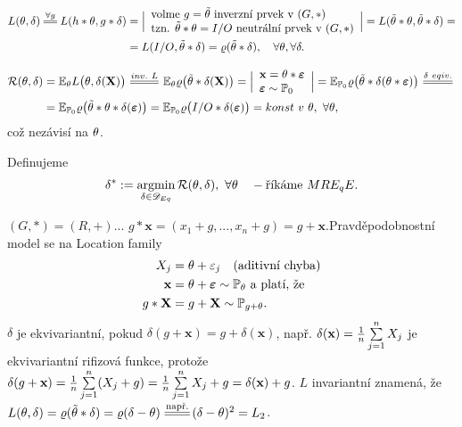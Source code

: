 \begin{dusl}
	\[
	\begin{split}
	L(\t,\delta)\equal{\forall g}L(h\ast\t,g\ast \delta)&=\Big| \begin{array}{l}
	\text{volme }g=\tilde{\t}\text{ inverzní prvek v }(G,\ast)\\\text{tzn. }\tilde{\t}\ast\t=I/O\text{ neutrální prvek v }(G,\ast)
	\end{array}
	\Big|=L(\tilde{\t}\ast\t,\tilde{\t}\ast\delta)=\\&=L(I/O,\tilde{\t}\ast\delta)=\rho(\tilde{\t}\ast\delta),\quad\forall\t,\forall\delta.
	\end{split}
	\] 
\end{dusl}
\begin{dusl}
	\[
	\begin{split}
	\RF(\t,\delta)&=\E_\t L\big(\t,\delta(\textbf{X})\big)\equal{inv.~L}\E_\t\rho\big(\tilde{\t}\ast\delta(\textbf{X})\big)=\Big|\begin{array}{l}
	\textbf{x}=\t\ast\boldsymbol{\epsilon}\\\boldsymbol{\epsilon}\sim\PP_0	
	\end{array}
	\Big|=\E_{\PP_0}\rho\big(\tilde{\t}\ast\delta(\t\ast\boldsymbol{\epsilon})\big)\equal{\delta~eqiv.}\\&=\E_{\PP_0}\rho\big(\tilde{\t}\ast\t\ast\delta(\boldsymbol{\epsilon})\big)=\E_{\PP_0}\rho\big(I/O\ast\delta(\boldsymbol{\epsilon})\big)=konst~v~\t,~\forall\t,
	\end{split}
	\]
což nezávisí na $\theta$.
\end{dusl}
\begin{define}
	Definujeme $$ \delta^\ast:=\mathop{\mathrm{argmin}}_{\delta\in\mathscr{D}_{Eq}}\mathcal{R}(\theta,\delta),~\forall\theta\quad-\text{říkáme }MRE_qE.$$
\end{define}
\begin{example}
	$(G,\ast)=(R,+)$... $g\ast\textbf{x}=(x_1+g,...,x_n+g)=g+\textbf{x}.$Pravděpodobnostní model se na Location family
	\[
\begin{split}
X_j&=\theta+\varepsilon_j\quad(\text{aditivní chyba})\\
\textbf{x}&=\theta+\boldsymbol{\varepsilon}\sim\mathbb{P}_\theta\text{ a platí, že }\\
g\ast \textbf{X}&=g+\textbf{X}\sim \mathbb{P}_{g+\theta}.
\end{split}
\]
	$\delta$ je ekvivariantní, pokud $\delta(g+\textbf{x})=g+\delta(\textbf{x})$, např. $\delta(\textbf{x})=\frac{1}{n}\sum\limits_{j=1}^{n} X_j$ je ekvivariantní rifizová funkce, protože $\delta(g+\textbf{x})=\frac{1}{n}\sum\limits_{j=1}^{n} (X_j+g)=\frac{1}{n}\sum\limits_{j=1}^{n} X_j + g=\delta(\textbf{x})+g$. $L$ invariantní znamená, že $L(\t,\delta)=\rho(\tilde{\t}\ast\delta)=\rho(\delta-\t)\equal{\text{např.}}(\delta-\t)^2=L_2$.
\end{example}

